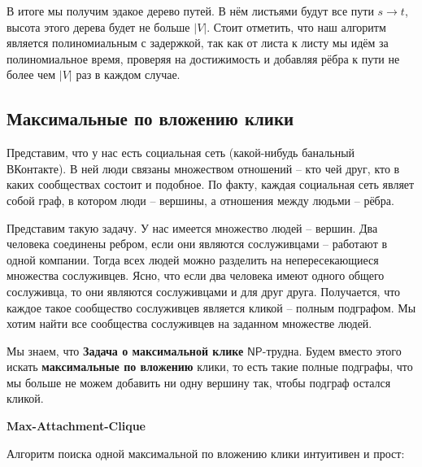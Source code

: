 \documentclass[a4paper,12pt]{article}
\newcommand{\NPclass}{\mathsf{NP}}
\begin{document}
В итоге мы получим эдакое дерево путей. В нём листьями будут все пути $s \rightarrow t$, высота этого дерева будет не больше $|V|$. Стоит отметить, что наш алгоритм является полиномиальным с задержкой, так как от листа к листу мы идём за полиномиальное время, проверяя на достижимость и добавляя рёбра к пути не более чем $|V|$ раз в каждом случае.

\subsection{Максимальные по вложению клики}

Представим, что у нас есть социальная сеть (какой-нибудь банальный ВКонтакте). В ней люди связаны множеством отношений -- кто чей друг, кто в каких сообществах состоит и подобное. По факту, каждая социальная сеть являет собой граф, в котором люди -- вершины, а отношения между людьми -- рёбра.

Представим такую задачу. У нас имеется множество людей -- вершин. Два человека соединены ребром, если они являются сослуживцами -- работают в одной компании. Тогда всех людей можно разделить на непересекающиеся множества сослуживцев. Ясно, что если два человека имеют одного общего сослуживца, то они являются сослуживцами и для друг друга. Получается, что каждое такое сообщество сослуживцев является кликой -- полным подграфом. Мы хотим найти все сообщества сослуживцев на заданном множестве людей.

Мы знаем, что \textbf{Задача о максимальной клике} $\NPclass$-трудна. Будем вместо этого искать \textbf{максимальные по вложению} клики, то есть такие полные подграфы, что мы больше не можем добавить ни одну вершину так, чтобы подграф остался кликой.

\textbf{Max-Attachment-Clique}
\begin{algorithmic}
\end{algorithmic}
Алгоритм поиска одной максимальной по вложению клики интуитивен и прост: 
\end{document}
